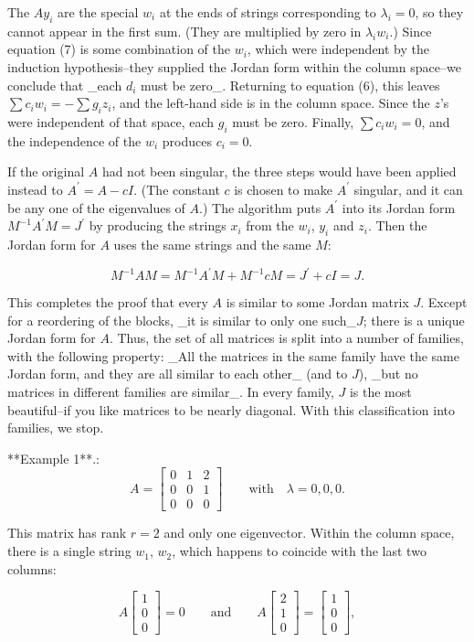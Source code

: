 The \(Ay_{i}\) are the special \(w_{i}\) at the ends of strings corresponding to \(\lambda_{i}=0\), so they cannot appear in the first sum. (They are multiplied by zero in \(\lambda_{i}w_{i}\).) Since equation (7) is some combination of the \(w_{i}\), which were independent by the induction hypothesis--they supplied the Jordan form within the column space--we conclude that _each \(d_{i}\) must be zero_. Returning to equation (6), this leaves \(\sum c_{i}w_{i}=-\sum g_{i}z_{i}\), and the left-hand side is in the column space. Since the \(z\)'s were independent of that space, each \(g_{i}\) must be zero. Finally, \(\sum c_{i}w_{i}=0\), and the independence of the \(w_{i}\) produces \(c_{i}=0\).

If the original \(A\) had not been singular, the three steps would have been applied instead to \(A^{\prime}=A-cI\). (The constant \(c\) is chosen to make \(A^{\prime}\) singular, and it can be any one of the eigenvalues of \(A\).) The algorithm puts \(A^{\prime}\) into its Jordan form \(M^{-1}A^{\prime}M=J^{\prime}\) by producing the strings \(x_{i}\) from the \(w_{i}\), \(y_{i}\) and \(z_{i}\). Then the Jordan form for \(A\) uses the same strings and the same \(M\):

\[M^{-1}AM=M^{-1}A^{\prime}M+M^{-1}cM=J^{\prime}+cI=J.\]

This completes the proof that every \(A\) is similar to some Jordan matrix \(J\). Except for a reordering of the blocks, _it is similar to only one such_\(J\); there is a unique Jordan form for \(A\). Thus, the set of all matrices is split into a number of families, with the following property: _All the matrices in the same family have the same Jordan form, and they are all similar to each other_ (and to \(J\)), _but no matrices in different families are similar_. In every family, \(J\) is the most beautiful--if you like matrices to be nearly diagonal. With this classification into families, we stop.

**Example 1**.: \[A=\begin{bmatrix}0&1&2\\ 0&0&1\\ 0&0&0\end{bmatrix}\qquad\text{with}\quad\lambda=0,0,0.\]

This matrix has rank \(r=2\) and only one eigenvector. Within the column space, there is a single string \(w_{1}\), \(w_{2}\), which happens to coincide with the last two columns:

\[A\begin{bmatrix}1\\ 0\\ 0\end{bmatrix}=0\qquad\text{and}\qquad A\begin{bmatrix}2\\ 1\\ 0\end{bmatrix}=\begin{bmatrix}1\\ 0\\ 0\end{bmatrix},\]

